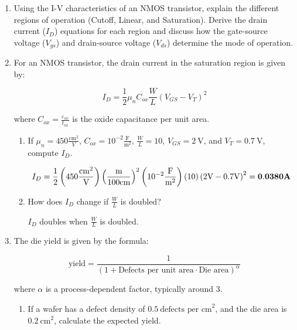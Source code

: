 \documentclass[fleqn]{article}
\begin{document}
\begin{enumerate}
		\item Using the I-V characteristics of an NMOS transistor, explain the different regions of operation (Cutoff, Linear, and Saturation). Derive the drain current ($I_D$) equations for each region and discuss how the gate-source voltage ($V_{gs}$) and drain-source voltage ($V_{ds}$) determine the mode of operation. 

		\item For an NMOS transistor, the drain current in the saturation region is given by:
		
		\begin{equation*}
			I_D = \frac{1}{2}{\mu_n}{C_{ox}}\frac{W}{L}(V_{GS}-V_{T})^2
		\end{equation*}
		
		where $C_{ox} = \frac{\varepsilon_{ox}}{t_{ox}}$ is the oxide capacitance per unit area.
		
		\begin{enumerate}
			\item If $\mu_n = 450 \frac{\text{cm}^2}{V}$, $C_{ox} = 10^{-2}\frac{\text{F}}{\text{m}^2}$, $\frac{W}{L} = 10$, $V_{GS} = 2\ \text{V}$, and $V_T = 0.7\ \text{V}$, compute $I_D$.
			
			\begin{equation*}
				I_D = \frac{1}{2}\left(450\frac{\text{cm}^2}{\text{V}}\right)\left(\frac{\text{m}}{100\text{cm}}\right)^2\left(10^{-2}\frac{\text{F}}{\text{m}^2}\right)(10)\left(2\text{V} - 0.7\text{V}\right)^2 = \mathbf{0.0380 \textbf{\text{A}}}
			\end{equation*}
			
			\item How does $I_D$ change if $\frac{W}{L}$ is doubled?
			
			$I_D$ doubles when $\frac{W}{L}$ is doubled.
			
		\end{enumerate}
		
		\item The die yield is given by the formula:
		
		\begin{equation*}
			\text{yield} = \frac{1}{(1+\text{Defects per unit area} \cdot \text{Die area})^{\alpha}}
		\end{equation*}
		
		where $\alpha$ is a process-dependent factor, typically around 3.
		
		\begin{enumerate}
			\item If a wafer has a defect density of $0.5\ \text{defects per cm}^2$, and the die area is $0.2\ \text{cm}^2$, calculate the expected yield.
			

\end{enumerate}
\end{enumerate}
\end{document}
